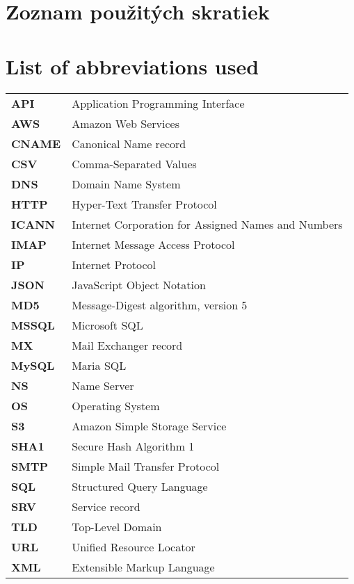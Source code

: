\thispagestyle{plain}

\ifx\FIITlagEN\undefined
\section*{\Huge Zoznam použitých skratiek}
\else
\section*{\Huge List of abbreviations used}
\fi
\vskip 1cm

\begin{tabular}{ >{\bfseries}m{2cm} m{10cm} }
API		& Application Programming Interface \\
AWS		& Amazon Web Services \\
CNAME	& Canonical Name record \\
CSV		& Comma-Separated Values \\
DNS		& Domain Name System \\
HTTP	& Hyper-Text Transfer Protocol \\
ICANN	& Internet Corporation for Assigned Names and Numbers \\
IMAP	& Internet Message Access Protocol \\
IP		& Internet Protocol \\
JSON	& JavaScript Object Notation \\
MD5		& Message-Digest algorithm, version 5 \\
MSSQL	& Microsoft SQL \\
MX		& Mail Exchanger record \\
MySQL	& Maria SQL  \\
NS		& Name Server \\
OS		& Operating System \\
S3		& Amazon Simple Storage Service \\
SHA1	& Secure Hash Algorithm 1 \\
SMTP	& Simple Mail Transfer Protocol \\
SQL		& Structured Query Language \\
SRV		& Service record \\
TLD		& Top-Level Domain \\
URL		& Unified Resource Locator \\
XML		& Extensible Markup Language   
\end{tabular}

\emptypage